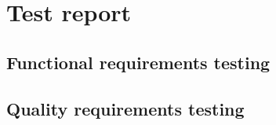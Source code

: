 \section{Test report}

\subsection{Functional requirements testing}

\subsection{Quality requirements testing}






